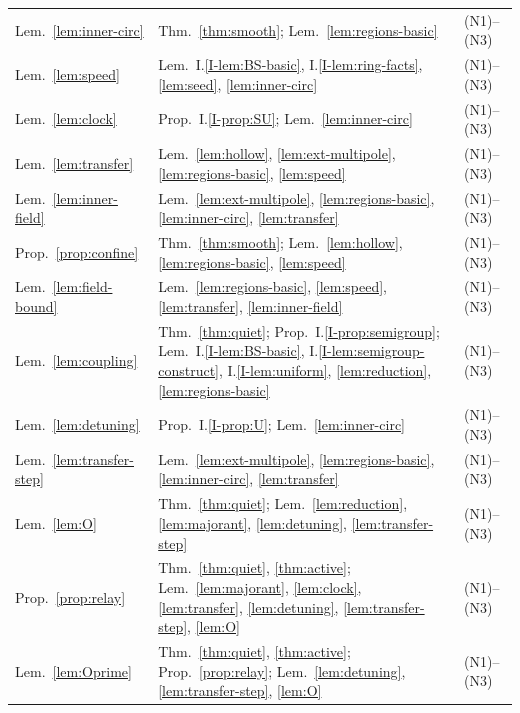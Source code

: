 \begin{longtable}{p{}p{}p{}}
\raggedright Lem.~\ref{lem:inner-circ}
  & \raggedright Thm.~\ref{thm:smooth}; Lem.~\ref{lem:regions-basic} & (N1)--(N3) \\
\raggedright Lem.~\ref{lem:speed}
  & \raggedright Lem.~I.\ref{I-lem:BS-basic}, I.\ref{I-lem:ring-facts}, \ref{lem:seed}, \ref{lem:inner-circ} & (N1)--(N3) \\
\raggedright Lem.~\ref{lem:clock}
  & \raggedright Prop.~I.\ref{I-prop:SU}; Lem.~\ref{lem:inner-circ} & (N1)--(N3) \\
\raggedright Lem.~\ref{lem:transfer}
  & \raggedright Lem.~\ref{lem:hollow}, \ref{lem:ext-multipole}, \ref{lem:regions-basic}, \ref{lem:speed} & (N1)--(N3) \\
\raggedright Lem.~\ref{lem:inner-field}
  & \raggedright Lem.~\ref{lem:ext-multipole}, \ref{lem:regions-basic}, \ref{lem:inner-circ}, \ref{lem:transfer} & (N1)--(N3) \\
\raggedright Prop.~\ref{prop:confine}
  & \raggedright Thm.~\ref{thm:smooth}; Lem.~\ref{lem:hollow}, \ref{lem:regions-basic}, \ref{lem:speed} & (N1)--(N3) \\
\raggedright Lem.~\ref{lem:field-bound}
  & \raggedright Lem.~\ref{lem:regions-basic}, \ref{lem:speed}, \ref{lem:transfer}, \ref{lem:inner-field} & (N1)--(N3) \\
\raggedright Lem.~\ref{lem:coupling}
  & \raggedright Thm.~\ref{thm:quiet}; Prop.~I.\ref{I-prop:semigroup}; Lem.~I.\ref{I-lem:BS-basic}, I.\ref{I-lem:semigroup-construct}, I.\ref{I-lem:uniform}, \ref{lem:reduction}, \ref{lem:regions-basic} & (N1)--(N3) \\
\raggedright Lem.~\ref{lem:detuning}
  & \raggedright Prop.~I.\ref{I-prop:U}; Lem.~\ref{lem:inner-circ} & (N1)--(N3) \\
\raggedright Lem.~\ref{lem:transfer-step}
  & \raggedright Lem.~\ref{lem:ext-multipole}, \ref{lem:regions-basic}, \ref{lem:inner-circ}, \ref{lem:transfer} & (N1)--(N3) \\
\raggedright Lem.~\ref{lem:O}
  & \raggedright Thm.~\ref{thm:quiet}; Lem.~\ref{lem:reduction}, \ref{lem:majorant}, \ref{lem:detuning}, \ref{lem:transfer-step} & (N1)--(N3) \\
\raggedright Prop.~\ref{prop:relay}
  & \raggedright Thm.~\ref{thm:quiet}, \ref{thm:active}; Lem.~\ref{lem:majorant}, \ref{lem:clock}, \ref{lem:transfer}, \ref{lem:detuning}, \ref{lem:transfer-step}, \ref{lem:O} & (N1)--(N3) \\
\raggedright Lem.~\ref{lem:Oprime}
  & \raggedright Thm.~\ref{thm:quiet}, \ref{thm:active}; Prop.~\ref{prop:relay}; Lem.~\ref{lem:detuning}, \ref{lem:transfer-step}, \ref{lem:O} & (N1)--(N3) \\

\end{longtable}
